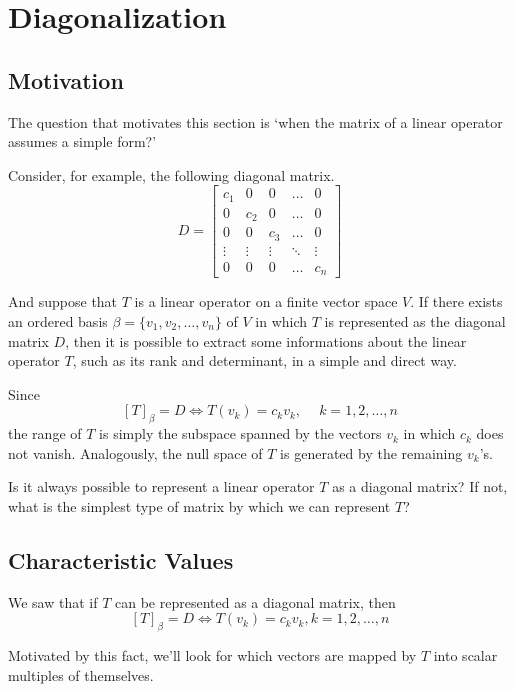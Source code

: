 \section{Diagonalization}

\subsection{Motivation}

The question that motivates this section is `when the matrix of a linear operator assumes a simple form?'

Consider, for example, the following diagonal matrix.
\[
D = \begin{bmatrix}
c_1 & 0 & 0 & \ldots & 0 \\
0 & c_2 & 0 & \ldots & 0 \\
0 & 0 & c_3 & \ldots & 0 \\
\vdots & \vdots & \vdots & \ddots & \vdots \\
0 & 0 & 0 & \ldots & c_n
\end{bmatrix}
\]

And suppose that $T$ is a linear operator on a finite vector space $V$. If there exists an ordered basis $\beta = \{ v_1, v_2, \ldots, v_n \}$ of $V$ in which $T$ is represented as the diagonal matrix $D$, then it is possible to extract some informations about the linear operator $T$, such as its rank and determinant, in a simple and direct way.

Since 
\[
[T]_\beta = D \iff T(v_k) = c_k v_k, ~\quad k = 1, 2, \ldots, n
\]
the range of $T$ is simply the subspace spanned by the vectors $v_k$ in which $c_k$ does not vanish. Analogously, the null space  of $T$ is generated by the remaining $v_k$'s. 

Is it always possible to represent a linear operator $T$ as a diagonal matrix? If not, what is the simplest type of matrix by which we can represent $T$?

\subsection{Characteristic Values}

We saw that if $T$ can be represented as a diagonal matrix, then
\[
	[T]_\beta = D \iff T(v_k) = c_k v_k, k = 1, 2, \ldots, n
\]

Motivated by this fact, we'll look for which vectors are mapped by $T$ into scalar multiples of themselves.

